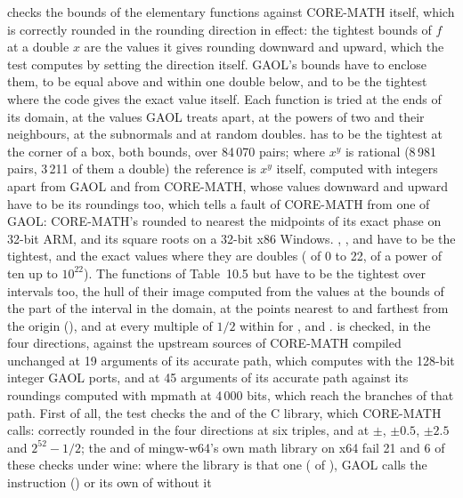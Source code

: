  checks the bounds of the elementary functions against
CORE-MATH itself, which is correctly rounded in the rounding direction in
effect: the tightest bounds of $f$ at a double $x$ are the values it gives
rounding downward and upward, which the test computes by setting the
direction itself. GAOL's bounds have to enclose them, to be equal above and
within one double below, and to be the tightest where the code gives the
exact value itself. Each function is tried at the ends of its domain, at the
values GAOL treats apart, at the powers of two and their neighbours, at the
subnormals and at random doubles.  has to be the tightest
at the corner of a box, both bounds, over 84\,070 pairs; where $x^y$ is
rational (8\,981 pairs, 3\,211 of them a double) the reference is $x^y$
itself, computed with integers apart from GAOL and from CORE-MATH, whose
values downward and upward have to be its roundings too, which tells a
fault of CORE-MATH from one of GAOL: CORE-MATH's  rounded to
nearest the midpoints of its exact phase on 32-bit ARM, and its square roots
on a 32-bit x86 Windows. , ,  and
 have to be the tightest, and the exact values where they are
doubles ( of 0 to 22,  of a power of ten up to
$10^{22}$). The functions of Table~10.5 but 
have to be the tightest over intervals too, the hull of their image computed
from the values at the bounds of the part of the interval in the domain, at
the points nearest to and farthest from the origin (), and at
every multiple of $1/2$ within for ,  and
.\newinvfive{}  is checked, in the four directions,
against the upstream sources of CORE-MATH compiled unchanged at 19 arguments
of its accurate path, which computes with the 128-bit integer GAOL ports,
and  at 45 arguments of its accurate path against its roundings
computed with mpmath at 4\,000 bits, which reach the branches of that path.
First of all, the test checks the  and  of the C
library, which CORE-MATH calls:  correctly rounded in the four
directions at six triples, and  at
$\pm$, $\pm0.5$, $\pm2.5$ and $2^{52}-1/2$;
the  and  of
mingw-w64's own math library on x64 fail 21 and 6 of these checks under
wine:\newinvfive{} where the library is that one (
of ), GAOL calls the instruction () or
its own  of  without it
